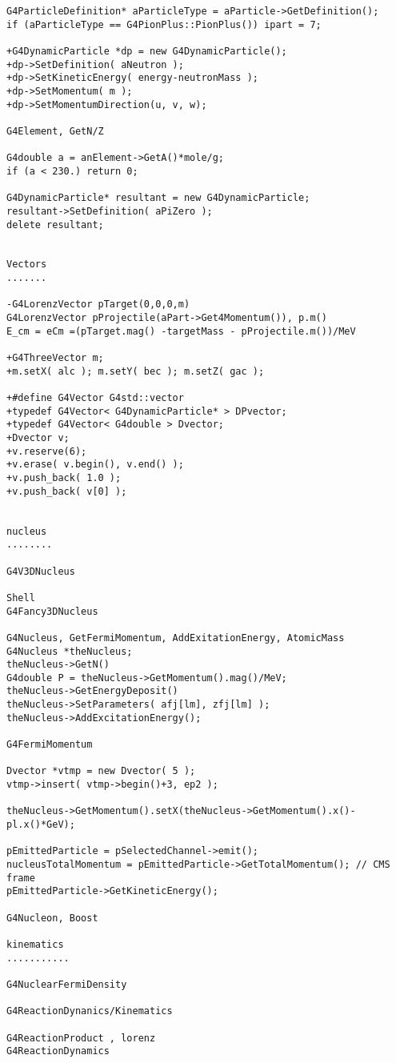 \begin{verbatim}
G4ParticleDefinition* aParticleType = aParticle->GetDefinition();
if (aParticleType == G4PionPlus::PionPlus()) ipart = 7;

+G4DynamicParticle *dp = new G4DynamicParticle();
+dp->SetDefinition( aNeutron );
+dp->SetKineticEnergy( energy-neutronMass );
+dp->SetMomentum( m );
+dp->SetMomentumDirection(u, v, w);  

G4Element, GetN/Z

G4double a = anElement->GetA()*mole/g;
if (a < 230.) return 0;

G4DynamicParticle* resultant = new G4DynamicParticle;
resultant->SetDefinition( aPiZero );
delete resultant;


Vectors
.......

-G4LorenzVector pTarget(0,0,0,m)
G4LorenzVector pProjectile(aPart->Get4Momentum()), p.m()
E_cm = eCm =(pTarget.mag() -targetMass - pProjectile.m())/MeV

+G4ThreeVector m;
+m.setX( alc ); m.setY( bec ); m.setZ( gac );

+#define G4Vector G4std::vector
+typedef G4Vector< G4DynamicParticle* > DPvector;
+typedef G4Vector< G4double > Dvector;
+Dvector v;
+v.reserve(6);  
+v.erase( v.begin(), v.end() );
+v.push_back( 1.0 );
+v.push_back( v[0] );


nucleus
........

G4V3DNucleus

Shell
G4Fancy3DNucleus

G4Nucleus, GetFermiMomentum, AddExitationEnergy, AtomicMass 
G4Nucleus *theNucleus;
theNucleus->GetN()
G4double P = theNucleus->GetMomentum().mag()/MeV;
theNucleus->GetEnergyDeposit() 
theNucleus->SetParameters( afj[lm], zfj[lm] );
theNucleus->AddExcitationEnergy();

G4FermiMomentum

Dvector *vtmp = new Dvector( 5 );
vtmp->insert( vtmp->begin()+3, ep2 );

theNucleus->GetMomentum().setX(theNucleus->GetMomentum().x()-pl.x()*GeV);

pEmittedParticle = pSelectedChannel->emit();
nucleusTotalMomentum = pEmittedParticle->GetTotalMomentum(); // CMS frame
pEmittedParticle->GetKineticEnergy();

G4Nucleon, Boost

kinematics
...........

G4NuclearFermiDensity

G4ReactionDynanics/Kinematics

G4ReactionProduct , lorenz
G4ReactionDynamics 


\end{verbatim}
